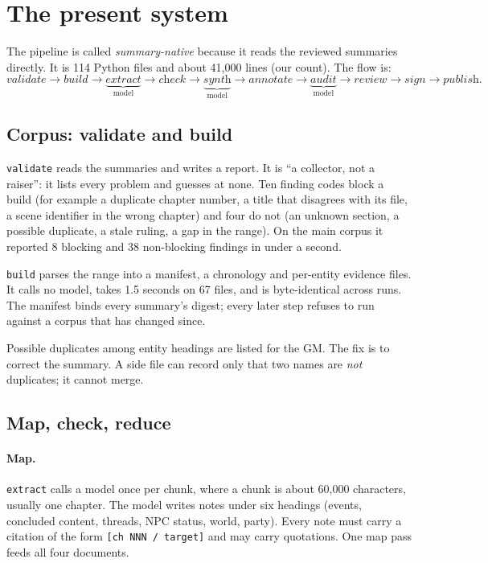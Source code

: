 \documentclass[11pt]{article}
\newcommand{\code}[1]{\texttt{#1}}
\begin{document}
\section{The present system}
\label{sec:system}

The pipeline is called \emph{summary-native} because it reads the reviewed summaries
directly. It is 114 Python files and about 41{,}000 lines (our count). The flow is:
\[
\textit{validate} \rightarrow \textit{build} \rightarrow
\underbrace{\textit{extract}}_{\text{model}} \rightarrow \textit{check} \rightarrow
\underbrace{\textit{synth}}_{\text{model}} \rightarrow \textit{annotate} \rightarrow
\underbrace{\textit{audit}}_{\text{model}} \rightarrow \textit{review} \rightarrow
\textit{sign} \rightarrow \textit{publish}.
\]

\subsection{Corpus: validate and build}

\code{validate} reads the summaries and writes a report. It is ``a collector, not a
raiser'': it lists every problem and guesses at none. Ten finding codes block a build
(for example a duplicate chapter number, a title that disagrees with its file, a scene
identifier in the wrong chapter) and four do not (an unknown section, a possible
duplicate, a stale ruling, a gap in the range). On the main corpus it reported 8 blocking
and 38 non-blocking findings in under a second.

\code{build} parses the range into a manifest, a chronology and per-entity evidence
files. It calls no model, takes 1.5 seconds on 67 files, and is byte-identical across
runs. The manifest binds every summary's digest; every later step refuses to run against
a corpus that has changed since.

Possible duplicates among entity headings are listed for the GM. The fix is to correct
the summary. A side file can record only that two names are \emph{not} duplicates; it
cannot merge.

\subsection{Map, check, reduce}

\paragraph{Map.} \code{extract} calls a model once per chunk, where a chunk is about
60{,}000 characters, usually one chapter. The model writes notes under six headings
(events, concluded content, threads, NPC status, world, party). Every note must carry a
citation of the form \code{[ch NNN / target]} and may carry quotations. One map pass
feeds all four documents.
\end{document}
